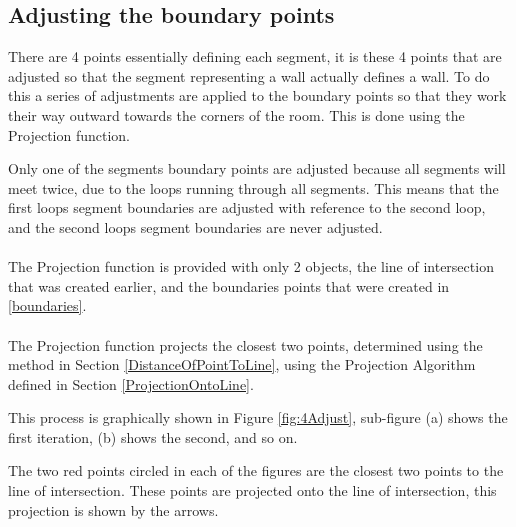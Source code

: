 		\subsection{Adjusting the boundary points}
			There are 4 points essentially defining each segment, it is these 4 points that are adjusted so that the segment representing a wall actually defines a wall. To do this a series of adjustments are applied to the boundary points so that they work their way outward towards the corners of the room. This is done using the Projection function.
			
			Only one of the segments boundary points are adjusted because all segments will meet twice, due to the loops running through all segments. This means that the first loops segment boundaries are adjusted with reference to the second loop, and the second loops segment boundaries are never adjusted.\\
			\\
			The Projection function is provided with only 2 objects, the line of intersection that was created earlier, and the boundaries points that were created in \ref{boundaries}.\\
			\\
			The Projection function projects the closest two points, determined using the method in Section \ref{DistanceOfPointToLine}, using the Projection Algorithm  defined in Section \ref{ProjectionOntoLine}.
			
			This process is graphically shown in Figure \ref{fig:4Adjust},  sub-figure (a) shows the first iteration, (b) shows the second, and so on.
			
			The two red points circled in each of the figures are the closest two points to the line of intersection. These points are projected onto the line of intersection, this projection is shown by the arrows.
			
